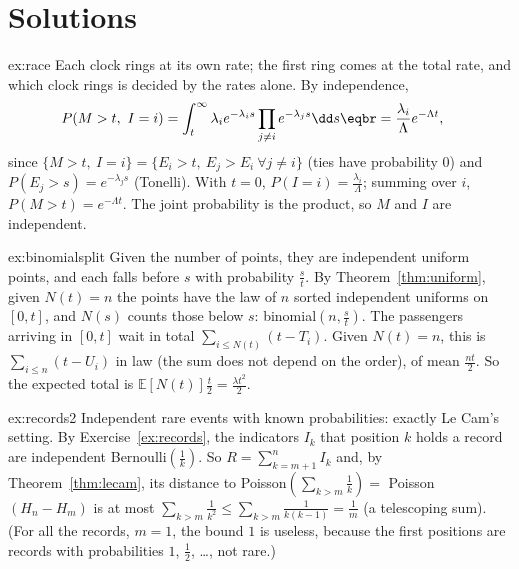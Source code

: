 \section{Solutions}

\begin{solution}{ex:race}
\idea Each clock rings at its own rate; the first ring comes at the total rate, and which clock rings is decided by the
rates alone.
\writeup By independence,
\[
\begin{aligned}P(M>t,\ I=i)&=\int_t^\infty\lambda_ie^{-\lambda_is}\prod_{j\ne i}e^{-\lambda_js}\dd s\eqbr=\frac{\lambda_i}\Lambda e^{-\Lambda t},\end{aligned}
\]
since $\{M>t,\ I=i\}=\{E_i>t,\ E_j>E_i\ \forall j\ne i\}$ (ties have probability $0$) and $P(E_j>s)=e^{-\lambda_js}$ (Tonelli). With $t=0$, $P(I=i)=\frac{\lambda_i}\Lambda$; summing over $i$,
$P(M>t)=e^{-\Lambda t}$. The joint probability is the product, so $M$ and $I$ are independent.
\end{solution}

\begin{solution}{ex:binomialsplit}
\idea Given the number of points, they are independent uniform points, and each falls before $s$ with probability $\frac st$.
\writeup By Theorem~\ref{thm:uniform}, given $N(t)=n$ the points have the law of $n$ sorted independent uniforms on $[0,t]$, and $N(s)$ counts those below $s$:
binomial$(n,\frac st)$. The passengers arriving in $[0,t]$ wait in total $\sum_{i\le N(t)}(t-T_i)$. Given $N(t)=n$, this is $\sum_{i\le n}(t-U_i)$ in law (the sum does not
depend on the order), of mean $\frac{nt}2$. So the expected total is $\mathbb E[N(t)]\frac t2=\frac{\lambda t^2}2$.
\end{solution}

\begin{solution}{ex:records2}
\idea Independent rare events with known probabilities: exactly Le Cam's setting.
\writeup By Exercise~\ref{ex:records}, the indicators $I_k$ that position $k$ holds a record are independent Bernoulli$(\frac1k)$. So $R=\sum_{k=m+1}^nI_k$ and, by
Theorem~\ref{thm:lecam}, its distance to Poisson$(\sum_{k>m}\frac1k)=$ Poisson$(H_n-H_m)$ is at most $\sum_{k>m}\frac1{k^2}\le\sum_{k>m}\frac1{k(k-1)}=\frac1m$ (a telescoping sum). (For all
the records, $m=1$, the bound $1$ is useless, because the first positions are records with probabilities $1$, $\frac12$, \dots, not rare.)
\end{solution}

